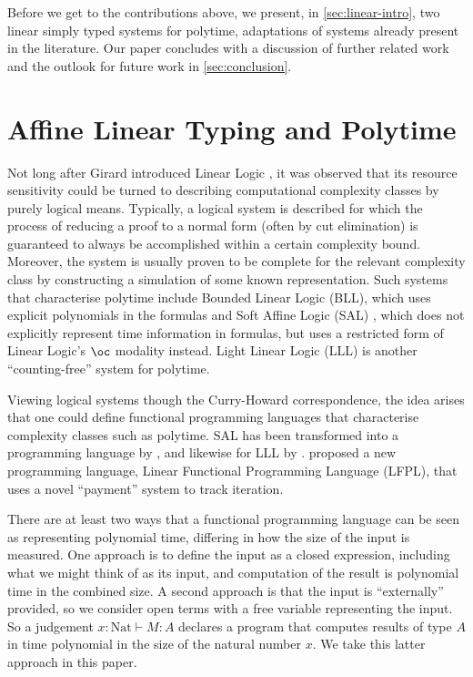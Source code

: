 \documentclass[acmsmall,screen]{acmart}
\newcommand{\tyNat}{\mathrm{Nat}}
\begin{document}
Before we get to the contributions above, we present, in
\autoref{sec:linear-intro}, two linear simply typed systems for
polytime, adaptations of systems already present in the
literature. Our paper concludes with a discussion of further related
work and the outlook for future work in \autoref{sec:conclusion}.

\section{Affine Linear Typing and Polytime}
\label{sec:linear-intro}

Not long after Girard introduced Linear Logic \cite{girard87}, it was
observed that its resource sensitivity could be turned to describing
computational complexity classes by purely logical means. Typically, a
logical system is described for which the process of reducing a proof
to a normal form (often by cut elimination) is guaranteed to always be
accomplished within a certain complexity bound. Moreover, the system
is usually proven to be complete for the relevant complexity class by
constructing a simulation of some known representation. Such systems
that characterise polytime include Bounded Linear Logic (BLL), which
uses explicit polynomials in the formulas \cite{bll92} and Soft Affine
Logic (SAL) \cite{Lafont04}, which does not explicitly represent time
information in formulas, but uses a restricted form of Linear Logic's
$\oc$ modality instead. Light Linear Logic (LLL) \cite{lll98} is
another ``counting-free'' system for polytime.

Viewing logical systems though the Curry-Howard correspondence, the
idea arises that one could define functional programming languages
that characterise complexity classes such as polytime. SAL has been
transformed into a programming language by \citet{BaillotM04}, and
likewise for LLL by \citet{BaillotGM10}. \citet{hofmann99lfpl}
proposed a new programming language, Linear Functional Programming
Language (LFPL), that uses a novel ``payment'' system to track
iteration.

There are at least two ways that a functional programming language can
be seen as representing polynomial time, differing in how the size of
the input is measured. One approach is to define the input as a closed
expression, including what we might think of as its input, and
computation of the result is polynomial time in the combined size. A
second approach is that the input is ``externally'' provided, so we
consider open terms with a free variable representing the input. So a
judgement $x : \tyNat \vdash M : A$ declares a program that computes
results of type $A$ in time polynomial in the size of the natural
number $x$. We take this latter approach in this paper.
\end{document}
